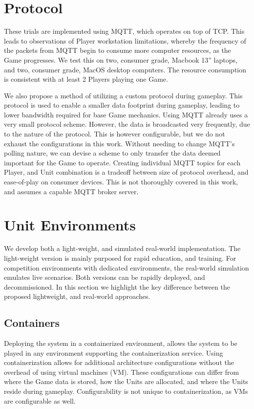 \documentclass[10pt, titlepage, twocolumn]{article}
\newcommand{\ii}{\indent\indent}
\begin{document}
\section{Protocol}
These trials are implemented using MQTT, which operates on top of TCP. This leads to observations of Player workstation limitations, whereby the frequency of the packets from MQTT begin to consume more computer resources, as the Game progresses. We test this on two, consumer grade, Macbook 13'' laptops, and two, consumer grade, MacOS desktop computers. The resource consumption is consistent with at least 2 Players playing one Game. 

We also propose a method of utilizing a custom protocol during gameplay. This protocol is used to enable a smaller data footprint during gameplay, leading to lower bandwidth required for base Game mechanics. Using MQTT already uses a very small protocol scheme. However, the data is broadcasted very frequently, due to the nature of the protocol. This is however configurable, but we do not exhaust the configurations in this work. Without needing to change MQTT's polling nature, we can devise a scheme to only transfer the data deemed important for the Game to operate. Creating individual MQTT topics for each Player, and Unit combination is a tradeoff between size of protocol overhead, and ease-of-play on consumer devices. This is not thoroughly covered in this work, and assumes a capable MQTT broker server.


\section{Unit Environments}
\indent
We develop both a light-weight, and simulated real-world implementation. The light-weight version is mainly purposed for rapid education, and training. For competition environments with dedicated environments, the real-world simulation emulates live scenarios. Both versions can be rapidly deployed, and decommissioned. In this section we highlight the key difference between the proposed lightweight, and real-world approaches.


\subsection{Containers}
\ii
Deploying the system in a containerized environment, allows the system to be played in any environment supporting the containerization service. Using containerization allows for additional architecture configurations without the overhead of using virtual machines (VM). These configurations can differ from where the Game data is stored, how the Units are allocated, and where the Units reside during gameplay. Configurability is not unique to containerization, as VMs are configurable as well. 
\end{document}
